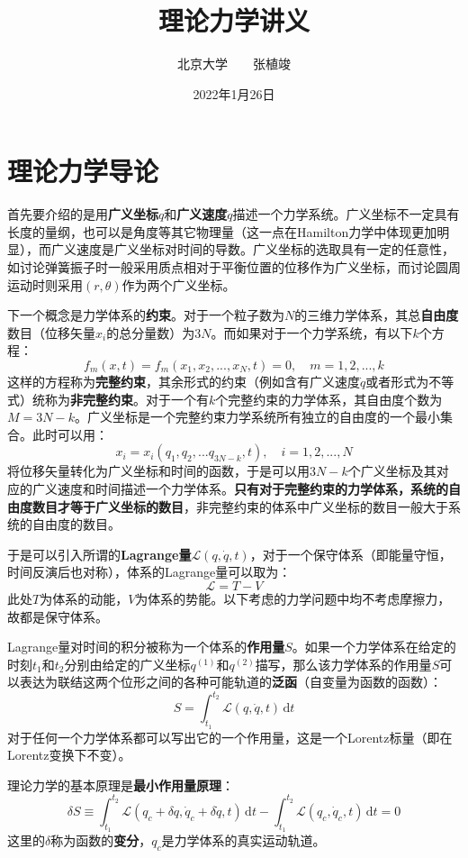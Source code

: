 \documentclass[a4paper,openany]{book}
\begin{document}
\title{\Huge\textbf{理论力学讲义}}
\author{\kaishu\Large 北京大学\ \ \ \ 张植竣}
\date{\kaishu\Large 2022年1月26日}
\maketitle

\chapter*{理论力学导论}

首先要介绍的是用\textbf{广义坐标}$q$和\textbf{广义速度}$\dot{q}$描述一个力学系统。广义坐标不一定具有长度的量纲，也可以是角度等其它物理量（这一点在Hamilton力学中体现更加明显），而广义速度是广义坐标对时间的导数。广义坐标的选取具有一定的任意性，如讨论弹簧振子时一般采用质点相对于平衡位置的位移作为广义坐标，而讨论圆周运动时则采用$(r,\theta)$作为两个广义坐标。

下一个概念是力学体系的\textbf{约束}。对于一个粒子数为$N$的三维力学体系，其总\textbf{自由度}数目（位移矢量$x_i$的总分量数）为$3N$。而如果对于一个力学系统，有以下$k$个方程：
\[
    f_m(x,t) = f_m(x_1,x_2,...,x_N,t) = 0,\quad m=1,2,...,k
\]
这样的方程称为\textbf{完整约束}，其余形式的约束（例如含有广义速度$\dot{q}$或者形式为不等式）统称为\textbf{非完整约束}。对于一个有$k$个完整约束的力学体系，其自由度个数为$M = 3N-k$。广义坐标是一个完整约束力学系统所有独立的自由度的一个最小集合。此时可以用：
\[
    x_i = x_i(q_1,q_2,...q_{3N-k},t),\quad i=1,2,...,N
\]
将位移矢量转化为广义坐标和时间的函数，于是可以用$3N-k$个广义坐标及其对应的广义速度和时间描述一个力学体系。\textbf{只有对于完整约束的力学体系，系统的自由度数目才等于广义坐标的数目}，非完整约束的体系中广义坐标的数目一般大于系统的自由度的数目。

于是可以引入所谓的\textbf{Lagrange量}$\boxed{\mathcal{L}(q,\dot{q},t)}$，对于一个保守体系（即能量守恒，时间反演后也对称），体系的Lagrange量可以取为：
\[
    \boxed{\mathcal{L}=T-V}
\]
此处$T$为体系的动能，$V$为体系的势能。以下考虑的力学问题中均不考虑摩擦力，故都是保守体系。

Lagrange量对时间的积分被称为一个体系的\textbf{作用量}$\boxed{S}$。如果一个力学体系在给定的时刻$t_1$和$t_2$分别由给定的广义坐标$q^{(1)}$和$q^{(2)}$描写，那么该力学体系的作用量$S$可以表达为联结这两个位形之间的各种可能轨道的\textbf{泛函}（自变量为函数的函数）：
\[
    \boxed{S = \int_{t_1}^{t_2} \mathcal{L}(q,\dot{q},t)\,\mathrm{d}t}
\]
对于任何一个力学体系都可以写出它的一个作用量，这是一个Lorentz标量（即在Lorentz变换下不变）。

理论力学的基本原理是\textbf{最小作用量原理}：
\[
    \delta S \equiv \int_{t_1}^{t_2} \mathcal{L}(q_c + \delta q,\dot{q}_c + \delta \dot{q},t)\,\mathrm{d}t - \int_{t_1}^{t_2} \mathcal{L}(q_c,\dot{q}_c,t)\,\mathrm{d}t = 0
\]
这里的$\delta$称为函数的\textbf{变分}，$q_c$是力学体系的真实运动轨道。
\end{document}
